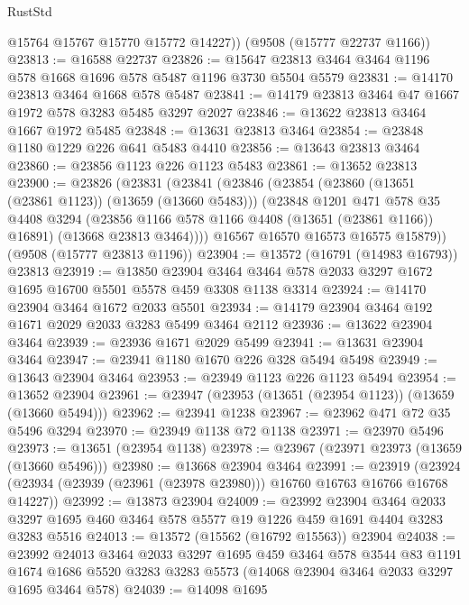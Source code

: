 \begin{lexlean}{RustStd}
\begin{coremodule}
        @15764
        @15767
        @15770
        @15772
        @14227))
    (@9508 (@15777 @22737 @1166))
@23813 := @16588 @22737
@23826 := @15647 @23813 @3464 @3464 @1196 @578 @1668 @1696 @578 @5487 @1196 @3730 @5504 @5579
@23831 := @14170 @23813 @3464 @1668 @578 @5487
@23841 := @14179 @23813 @3464 @47 @1667 @1972 @578 @3283 @5485 @3297 @2027
@23846 := @13622 @23813 @3464 @1667 @1972 @5485
@23848 := @13631 @23813 @3464
@23854 := @23848 @1180 @1229 @226 @641 @5483 @4410
@23856 := @13643 @23813 @3464
@23860 := @23856 @1123 @226 @1123 @5483
@23861 := @13652 @23813
@23900 := @23826
    (@23831
      (@23841
        (@23846
          (@23854
            (@23860 (@13651 (@23861 @1123)) (@13659 (@13660 @5483)))
            (@23848
              @1201
              @471
              @578
              @35
              @4408
              @3294
              (@23856 @1166 @578 @1166 @4408 (@13651 (@23861 @1166)) @16891)
              (@13668 @23813 @3464))))
        @16567
        @16570
        @16573
        @16575
        @15879))
    (@9508 (@15777 @23813 @1196))
@23904 := @13572 (@16791 (@14983 @16793)) @23813
@23919 := @13850
    @23904
    @3464
    @3464
    @578
    @2033
    @3297
    @1672
    @1695
    @16700
    @5501
    @5578
    @459
    @3308
    @1138
    @3314
@23924 := @14170 @23904 @3464 @1672 @2033 @5501
@23934 := @14179 @23904 @3464 @192 @1671 @2029 @2033 @3283 @5499 @3464 @2112
@23936 := @13622 @23904 @3464
@23939 := @23936 @1671 @2029 @5499
@23941 := @13631 @23904 @3464
@23947 := @23941 @1180 @1670 @226 @328 @5494 @5498
@23949 := @13643 @23904 @3464
@23953 := @23949 @1123 @226 @1123 @5494
@23954 := @13652 @23904
@23961 := @23947 (@23953 (@13651 (@23954 @1123)) (@13659 (@13660 @5494)))
@23962 := @23941 @1238
@23967 := @23962 @471 @72 @35 @5496 @3294
@23970 := @23949 @1138 @72 @1138
@23971 := @23970 @5496
@23973 := @13651 (@23954 @1138)
@23978 := @23967 (@23971 @23973 (@13659 (@13660 @5496)))
@23980 := @13668 @23904 @3464
@23991 := @23919
    (@23924 (@23934 (@23939 (@23961 (@23978 @23980))) @16760 @16763 @16766 @16768 @14227))
@23992 := @13873 @23904
@24009 := @23992
    @23904
    @3464
    @2033
    @3297
    @1695
    @460
    @3464
    @578
    @5577
    @19
    @1226
    @459
    @1691
    @4404
    @3283
    @3283
    @5516
@24013 := @13572 (@15562 (@16792 @15563)) @23904
@24038 := @23992
    @24013
    @3464
    @2033
    @3297
    @1695
    @459
    @3464
    @578
    @3544
    @83
    @1191
    @1674
    @1686
    @5520
    @3283
    @3283
    @5573
    (@14068 @23904 @3464 @2033 @3297 @1695 @3464 @578)
@24039 := @14098 @1695

\end{coremodule}
\end{lexlean}
